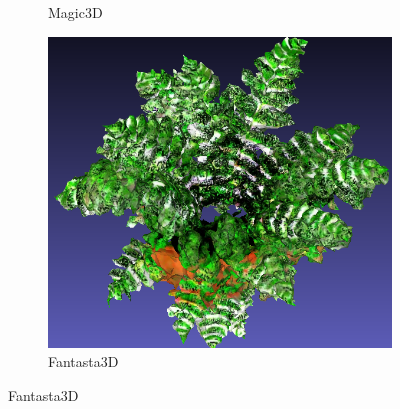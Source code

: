 \begin{figure}[ht]
\begin{subfigure}[b]{0.35\textwidth}
        \caption{Magic3D}
        \vspace{0.1cm}
    \end{subfigure}
    \begin{subfigure}[b]{0.32\textwidth}
        \centering
        \includegraphics[width=\textwidth]{figures/subjective/fantasia_fern_result.png}
        \caption{Fantasta3D}
        \vspace{0.1cm}
    \end{subfigure}


\end{figure}
